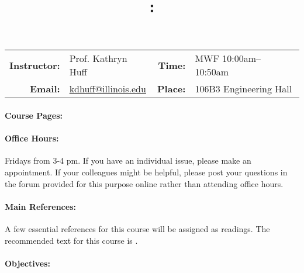 \documentclass[11pt, a4paper]{article}
\title{\CourseNumber: \CourseTitle\\}
\author{\CourseUniversity}
\date{\CourseSemester \CourseYear}
\makeatletter
\newcommand{\CourseNumber}{NPRE412}
\newcommand{\CourseInstructor}{Prof. Kathryn Huff\xspace}%
\newcommand{\CourseDays}{MWF\xspace}%
\newcommand{\CourseStart}{10:00am\xspace}%
\newcommand{\CourseEnd}{10:50am\xspace}%
\newcommand{\CourseInstructorEmail}{kdhuff@illinois.edu}
\newcommand{\CourseRoom}{106B3\xspace}%
\newcommand{\CourseBuilding}{Engineering Hall\xspace}%
\makeatother
\begin{document}
\maketitle
\renewcommand{\arraystretch}{1.5}
\begin{center}
\begin{table}[h]
\begin{tabularx}{\textwidth}{rXrX}
\hline
\textbf{Instructor:} & \CourseInstructor & \textbf{Time:} & \CourseDays \CourseStart -- \CourseEnd \\
\textbf{Email:} &  \href{mailto:\CourseInstructorEmail}{\CourseInstructorEmail} & \textbf{Place:} & \CourseRoom \CourseBuilding\\
\hline
\end{tabularx}
\end{table}
\end{center}

\paragraph{Course Pages:}
\begin{enumerate}
\item \url{https://compass2g.illinois.edu)
\item \url{https://github.com/katyhuff/\CourseNumber}
\item \url{https://piazza.com/illinois/fall2016/\CourseNumber/home}
\end{enumerate}

\paragraph{Office Hours:} Fridays from 3-4 pm. If you have an individual issue, 
please make an appointment. If your colleagues might be helpful, please post your 
questions in the forum provided for this purpose online rather than attending 
office hours.

\paragraph{Main References:}
A few essential references for this course will be assigned as readings. The 
recommended text for this course is \cite{tsoulfanidis_nuclear_2013}.

\renewcommand{\refname}{\normalfont\selectfont\normalsize}\vspace{-1cm} 


\paragraph{Objectives:} 
\end{document}
